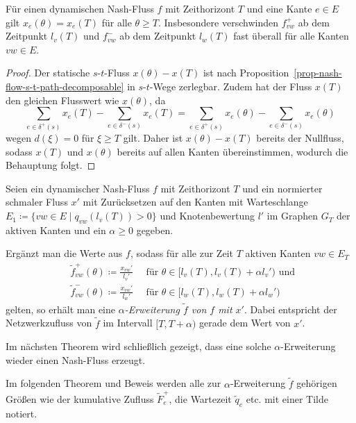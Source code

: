 \begin{proposition}
	Für einen dynamischen Nash-Fluss $f$ mit Zeithorizont $T$ und eine Kante $e\in E$ gilt $x_{e}(\theta) = x_{e}(T)$ für alle $\theta \geq T$.
	Insbesondere verschwinden $f_{vw}^+$ ab dem Zeitpunkt $l_v(T)$ und $f_{vw}^-$ ab dem Zeitpunkt $l_w(T)$ fast überall für alle Kanten $vw\in E$.
\end{proposition}
\begin{proof}
	Der statische $s$-$t$-Fluss $x(\theta) -x(T)$ ist nach Proposition~\ref{prop-nash-flow-s-t-path-decomposable} in $s$-$t$-Wege zerlegbar.
	Zudem hat der Fluss $x(T)$ den gleichen Flusswert wie $x(\theta)$, da
	\[ \sum_{e\in \delta^+(s)} x_e(T) - \sum_{e\in\delta^-(s)} x_e(T) = \sum_{e\in \delta^+(s)} x_e(\theta) - \sum_{e\in\delta^-(s)} x_e(\theta)\]
	wegen $d(\xi) = 0$ für $\xi \geq T $ gilt.
	Daher ist $x(\theta)- x(T)$ bereits der Nullfluss, sodass $x(T)$ und $x(\theta)$ bereits auf allen Kanten übereinstimmen, wodurch die Behauptung folgt.
\end{proof}

\begin{definition}
	Seien ein dynamischer Nash-Fluss $f$ mit Zeithorizont $T$ und ein normierter schmaler Fluss $x'$ mit Zurücksetzen auf den Kanten mit Warteschlange $E_1 \coloneq \{ vw\in E \mid q_{vw}(l_v(T)) > 0 \} $ und Knotenbewertung $l'$ im Graphen $G_T$ der aktiven Kanten und ein $\alpha \geq 0$ gegeben.
	
	Ergänzt man die Werte aus $f$, sodass für alle zur Zeit $T$ aktiven Kanten $vw\in E_T$
	\begin{align*}
	&\tilde{f}_{vw}^+(\theta)\coloneq \frac{x_{vw}'}{l_v'} \text{~~~ für $\theta\in [l_v(T), l_v(T)+\alpha l_v')$ und } \\ &\tilde{f}_{vw}^-(\theta)\coloneq \frac{x_{vw}'}{l_w'} \text{~~~ für $\theta\in [l_w(T), l_w(T)+\alpha l_w')$}
	\end{align*}
	gelten, so erhält man eine \emph{$\alpha$-Erweiterung $\tilde{f}$ von $f$ mit $x'$}.
	Dabei entspricht der Netzwerkzufluss von $\tilde{f}$ im Intervall $[T, T+\alpha)$ gerade dem Wert von $x'$.
\end{definition}

Im nächsten Theorem wird schließlich gezeigt, dass eine solche $\alpha$-Erweiterung wieder einen Nash-Fluss erzeugt.

\begin{notation}
	Im folgenden Theorem und Beweis werden alle zur $\alpha$-Erweiterung $\tilde{f}$ gehörigen Größen wie der kumulative Zufluss $\tilde{F}_e^+$, die Wartezeit $\tilde{q}_e$ etc. mit einer Tilde notiert.
\end{notation}

